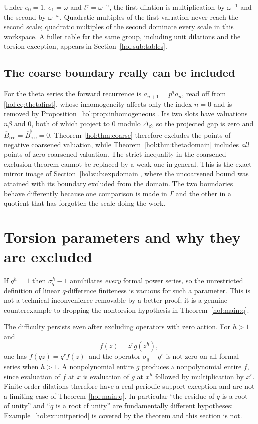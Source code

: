 \documentclass[11pt]{article}
\numberwithin{equation}{section}
\theoremstyle{definition}
\theoremstyle{remark}
\begin{document}
Under $e_0=1$, $e_1=\omega$ and $t^\gamma=\omega^{-\gamma}$, the first dilation
is multiplication by $\omega^{-1}$ and the second by $\omega^{-\omega}$.
Quadratic multiples of the first valuation never reach the second scale;
quadratic multiples of the second dominate every scale in this workspace. A
fuller table for the same group, including unit dilations and the torsion
exception, appears in Section~\ref{hol:sub:tables}.

\subsection{The coarse boundary really can be included}
\label{hol:sub:coarseboundary}

For the theta series the forward recurrence is $a_{n+1}=p^na_n$, read off from
\eqref{hol:eq:thetafirst}, whose inhomogeneity affects only the index $n=0$
and is removed by Proposition~\ref{hol:prop:inhomogeneous}. Its two slots have
valuations $n\beta$ and $0$, both of which project to $0$ modulo
$\Delta_\beta$, so the projected gap is zero and
$\overline B_{\mathrm{rec}}=\overline B^{\flat}_{\mathrm{rec}}=0$.
Theorem~\ref{hol:thm:coarse} therefore excludes the points of negative
coarsened valuation, while Theorem~\ref{hol:thm:thetadomain} includes
\emph{all} points of zero coarsened valuation. The strict inequality in the
coarsened exclusion theorem cannot be replaced by a weak one in general. This
is the exact mirror image of Section~\ref{hol:sub:expdomain}, where the
uncoarsened bound was attained with its boundary excluded from the domain. The
two boundaries behave differently because one comparison is made in $\Gamma$
and the other in a quotient that has forgotten the scale doing the work.

\section{Torsion parameters and why they are excluded}\label{hol:sec:torsion}

If $q^{h}=1$ then $\sigma_q^{h}-1$ annihilates \emph{every} formal power
series, so the unrestricted definition of linear $q$-difference finiteness is
vacuous for such a parameter. This is not a technical inconvenience removable
by a better proof; it is a genuine counterexample to dropping the nontorsion
hypothesis in Theorem~\ref{hol:main:q}.

The difficulty persists even after excluding operators with zero action. For
$h>1$ and
\[
 f(z)=z^rg(z^{h}),
\]
one has $f(qz)=q^rf(z)$, and the operator $\sigma_q-q^r$ is not zero on all
formal series when $h>1$. A nonpolynomial entire $g$ produces a nonpolynomial
entire $f$, since evaluation of $f$ at $x$ is evaluation of $g$ at $x^{h}$
followed by multiplication by $x^r$. Finite-order dilations therefore have a
real periodic-support exception and are not a limiting case of
Theorem~\ref{hol:main:q}. In particular ``the residue of $q$ is a root of
unity'' and ``$q$ is a root of unity'' are fundamentally different
hypotheses: Example~\ref{hol:ex:unitperiod} is covered by the theorem and this
section is not.
\end{document}
